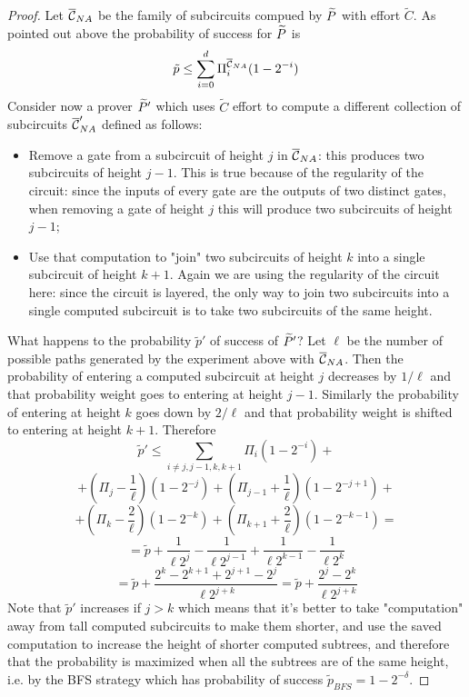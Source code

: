  \begin{proof}
Let $\overline{\cal{C}}_{NA}$ be the family of subcircuits compued by $\widetilde{P}$ with effort $\tilde{C}$. As pointed out above the probability of success for $\widetilde{P}$ is 
$$ \tilde{p} \leq \sum_{i=0}^{d} \Pi_i^{\overline{\cal{C}}_{NA}} (1 - 2^{-i})$$
Consider now a prover $\widetilde{P}'$ which uses $\tilde{C}$ effort to compute a different collection of subcircuits $\overline{\cal{C}}_{NA}'$ defined as follows: 
\begin{itemize}
\item Remove a gate from a subcircuit of height $j$ in $\overline{\cal{C}}_{NA}$: this produces two subcircuits of height $j-1$. This is true because of the regularity of the circuit: since the inputs of every gate are the outputs of two distinct gates, when removing a gate of height $j$ this will produce two subcircuits of height $j-1$;
\item Use that computation to "join" two subcircuits of height $k$ into a single subcircuit of height $k+1$. Again we are using the regularity of the circuit here: since the circuit is layered, the only way to join two subcircuits into a single computed subcircuit is to take two subcircuits of the same height. 
\end{itemize}
What happens to the probability $\tilde{p}'$ of success of $\widetilde{P}'$? Let $\ell$ be the number of possible paths generated by the experiment above
with $\overline{\cal{C}}_{NA}$. Then the probability of entering a computed subcircuit at height $j$ decreases by $1/\ell$ and that probability weight goes to entering at
height $j-1$. Similarly the probability of entering at height $k$ goes down by $2/\ell$ and that probability weight is shifted to entering at height $k+1$. 
Therefore 
$$ \tilde{p}' \leq \sum_{i \neq j,j-1,k,k+1} \Pi_i (1 - 2^{-i}) + $$
$$ + (\Pi_j - \frac{1}{\ell})(1-2^{-j}) + (\Pi_{j-1} + \frac{1}{\ell})(1-2^{-j+1}) + $$
$$ + (\Pi_k - \frac{2}{\ell})(1-2^{-k}) + (\Pi_{k+1} + \frac{2}{\ell})(1-2^{-k-1}) = $$
$$ = \tilde{p} + \frac{1}{\ell 2^j} - \frac{1}{\ell 2^{j-1}} + \frac{1}{\ell 2^{k-1}} - \frac{1}{\ell 2^k} $$
$$ = \tilde{p} +\frac{2^k-2^{k+1}+2^{j+1}-2^j}{\ell 2^{j+k}}
= \tilde{p} + \frac{2^j - 2^k}{\ell 2^{j+k}} $$
Note that $\tilde{p}'$ increases if $j > k$ which means that it's better to take "computation" away from tall computed subcircuits to make them shorter, and use the saved computation to increase the height of shorter computed subtrees, and therefore that the probability is maximized when all the subtrees are of the same height, i.e. by the BFS strategy which has probability of success $ \tilde{p}_{BFS} = 1 - 2^{-\delta}$.
\end{proof}

